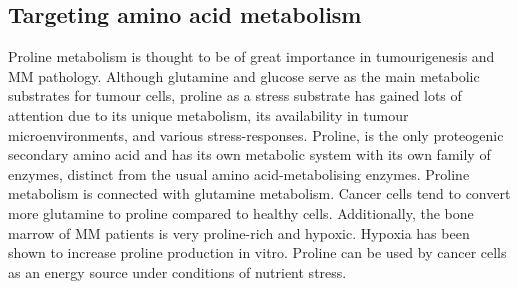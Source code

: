 \subsection{Targeting amino acid metabolism}
Proline metabolism is thought to be of great importance in tumourigenesis and MM pathology\cite{d2020proline,liu2013mirna}.
Although glutamine and glucose serve as the main metabolic substrates for tumour cells, proline as a stress substrate has gained lots of attention due to its unique metabolism, its availability in tumour microenvironments, and various stress-responses\cite{liu2013mirna}.
Proline, is the only proteogenic secondary amino acid and has its own metabolic system with its own family of enzymes, distinct from the usual amino acid-metabolising enzymes\cite{liu2013mirna}.
Proline metabolism is connected with glutamine metabolism.
Cancer cells tend to convert more glutamine to proline compared to healthy cells.
Additionally, the bone marrow of MM patients is very proline-rich and hypoxic.
Hypoxia has been shown to increase proline production in vitro.
Proline can be used by cancer cells as an energy source under conditions of nutrient stress\cite{phang2008metabolism}.


